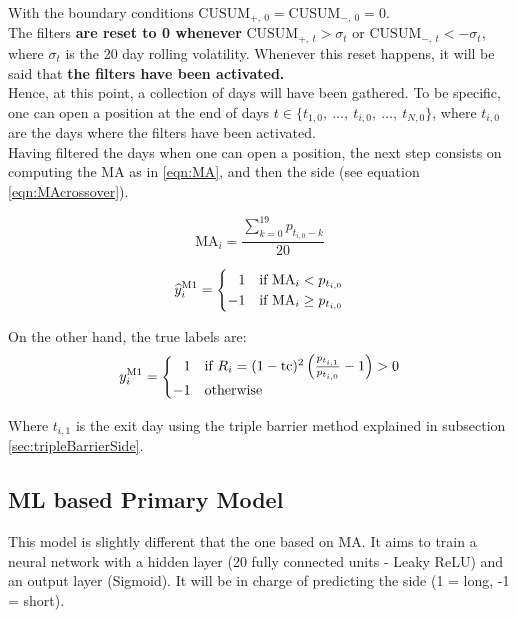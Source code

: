 \documentclass[a4paper]{report}
\begin{document}
With the boundary conditions $\text{CUSUM}_{+,\ 0} = 
\text{CUSUM}_{-,\ 0} = 0$.\\

The filters \textbf{are reset to 0 whenever}
$\text{CUSUM}_{+,\ t} > \sigma_t$ or $\text{CUSUM}_{-,\ t} < - \sigma_t$, 
where $\sigma_t$ is the 20 day rolling volatility. Whenever this reset 
happens, it will be said that \textbf{the filters have been activated.}\\

Hence, at this point, a collection of days will have been gathered. To be 
specific, one can open a position at the end of days $t \in \{t_{1,0},\ 
\ldots ,\ t_{i,0} ,\ \ldots,\ t_{N,0} \}$, where $t_{i,0}$ are the days 
where the filters have been activated.\\

Having filtered the days when one can open a position, the next step 
consists on computing the MA as in \ref{eqn:MA}, and then the side (see 
equation \ref{eqn:MAcrossover}).

\begin{equation}
\label{eqn:MA}
	\text{MA}_i = \frac{\sum_{k = 0}^{19} p_{{t_{i,0}}-k}}{20}
\end{equation}

\begin{equation}
\label{eqn:MAcrossover}
	\widehat{y}_i^{\text{M1}} =
	\begin{cases}
		\hfill 1  & \text{if}\ \text{MA}_i < p_{t_{i,0}}\\
		\hfill -1 & \text{if}\ \text{MA}_i \geq p_{t_{i,0}}
	\end{cases}
\end{equation}


On the other hand, the true labels are:
\begin{equation*}
	y_{i}^{\text{M1}} = 
	\begin{cases}
	\hfill 1 & \text{if}\ 
	R_i = (1 - \text{tc})^2 \left( \frac{p_{t_{i,1}}}{p_{t_{i,0}}} -1 
	\right) > 0\\
	\hfill -1 & \text{otherwise}	
	\end{cases}
\end{equation*}

Where $t_{i,1}$ is the exit day using the triple barrier method explained in 
subsection \ref{sec:tripleBarrierSide}.

\subsection{ML based Primary Model}
\label{sec:MLPrimaryModel}
This model is slightly different that the one based on MA. It aims to 
train a neural network with a hidden layer (20 fully connected units 
- Leaky ReLU) and an output layer (Sigmoid). It will be in charge of 
predicting the side (1 = long, -1 = short).\\
\end{document}
